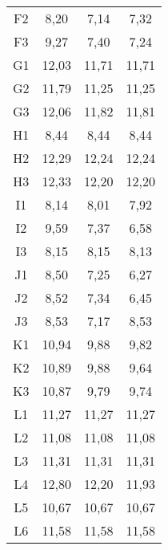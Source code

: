 \begin{center}
\begin{longtable}{cccc}
    F2    & 8,20  & 7,14  & 7,32 \\
    F3    & 9,27  & 7,40  & 7,24 \\
    G1    & 12,03 & 11,71 & 11,71 \\
    G2    & 11,79 & 11,25 & 11,25 \\
    G3    & 12,06 & 11,82 & 11,81 \\
    H1    & 8,44  & 8,44  & 8,44 \\
    H2    & 12,29 & 12,24 & 12,24 \\
    H3    & 12,33 & 12,20 & 12,20 \\
    I1    & 8,14  & 8,01  & 7,92 \\
    I2    & 9,59  & 7,37  & 6,58 \\
    I3    & 8,15  & 8,15  & 8,13 \\
    J1    & 8,50  & 7,25  & 6,27 \\
    J2    & 8,52  & 7,34  & 6,45 \\
    J3    & 8,53  & 7,17  & 8,53 \\
    K1    & 10,94 & 9,88  & 9,82 \\
    K2    & 10,89 & 9,88  & 9,64 \\
    K3    & 10,87 & 9,79  & 9,74 \\
    L1    & 11,27 & 11,27 & 11,27 \\
    L2    & 11,08 & 11,08 & 11,08 \\
    L3    & 11,31 & 11,31 & 11,31 \\
    L4    & 12,80 & 12,20 & 11,93 \\
    L5    & 10,67 & 10,67 & 10,67 \\
    L6    & 11,58 & 11,58 & 11,58 \\


\end{longtable}
\end{center}

